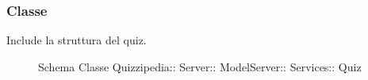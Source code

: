 \subsubsection{Classe }
Include la struttura del quiz.
\begin{figure}[H]
\centering
\noindent{}
\caption[Schema Classe Quiz]{Schema Classe Quizzipedia:: Server:: ModelServer:: Services:: Quiz}
\end{figure}
